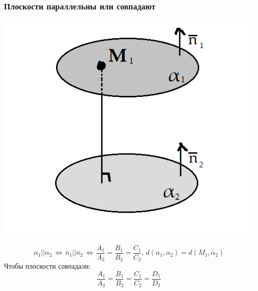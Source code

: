 \documentclass{article}
\begin{document}
\subsubsection{Плоскости параллельны или совпадают}
\begin{center}
    \includegraphics[scale=0.4]{pic6.png}
\end{center}
$$ \alpha_1||\alpha_2\,\Leftrightarrow\,\overline{n}_1||\overline{n}_2\,\Leftrightarrow\,\frac{A_1}{A_2}=\frac{B_1}{B_2}=\frac{C_1}{C_2},\,d(\alpha_1,\alpha_2)=d(M_1,\alpha_2) $$
Чтобы плоскости совпадали:
$$ \frac{A_1}{A_2}=\frac{B_1}{B_2}=\frac{C_1}{C_2}=\frac{D_1}{D_2} $$
\end{document}
